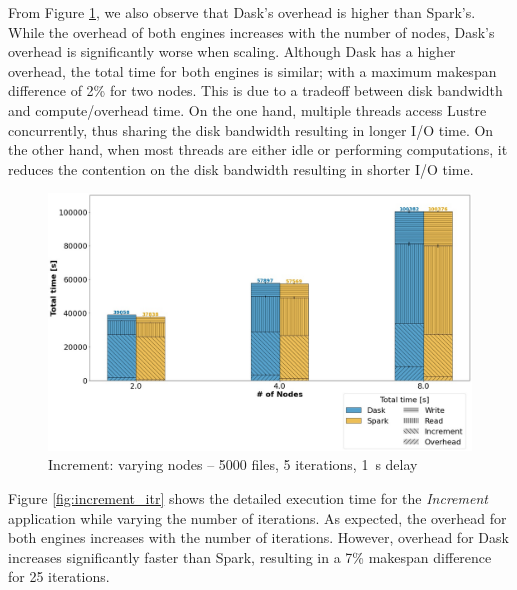 \documentclass[conference]{IEEEtran}
\begin{document}
From Figure \ref{fig:increment_worker}, we also observe that Dask's overhead is higher than Spark's.
While the overhead of both engines increases with the number of nodes, Dask's overhead is significantly worse when scaling.
Although Dask has a higher overhead, the total time for both engines is similar; with a maximum makespan difference of 2\% for two nodes.
This is due to a tradeoff between disk bandwidth and compute/overhead time.
On the one hand, multiple threads access Lustre concurrently, thus sharing the disk bandwidth resulting in longer I/O time.
On the other hand, when most threads are either idle or performing computations, it reduces the contention on the disk bandwidth resulting in shorter I/O time.
\begin{figure}[!t]
	\centering
	\includegraphics[clip,width=\columnwidth]{figures/stacked_increment_worker.jpg}
	\caption{Increment: varying nodes -- 5000 files, 5 iterations, \SI{1}{\second} delay}
	\label{fig:increment_worker}
\end{figure}
		
Figure \ref{fig:increment_itr} shows the detailed execution time for the \textit{Increment} application while varying the number of iterations.
As expected, the overhead for both engines increases with the number of iterations.
However, overhead for Dask increases significantly faster than Spark, resulting in a 7\% makespan difference for 25 iterations.
		
\end{document}
